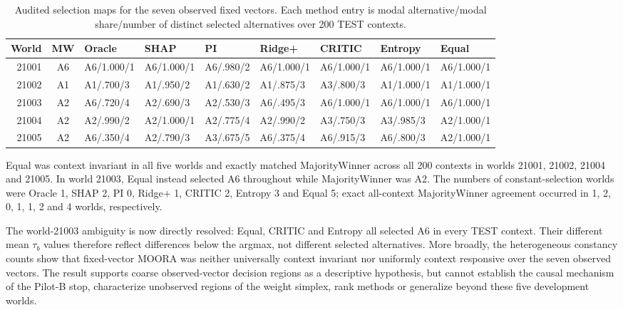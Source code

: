 \documentclass[runningheads]{llncs}
\begin{document}
\begin{table}[t]
\centering
\caption{Audited selection maps for the seven observed fixed vectors. Each method entry is
modal alternative/modal share/number of distinct selected alternatives over 200 TEST contexts.}
\label{supp:tab:fixedselectionmaps}
\scriptsize
\setlength{\tabcolsep}{2.1pt}
\begin{tabular}{@{}rclllllll@{}}
\toprule
World & MW & Oracle & SHAP & PI & Ridge+ & CRITIC & Entropy & Equal\\
\midrule
21001 & A6 & A6/1.000/1 & A6/1.000/1 & A6/.980/2 & A6/1.000/1 & A6/1.000/1 & A6/1.000/1 & A6/1.000/1\\
21002 & A1 & A1/.700/3 & A1/.950/2 & A1/.630/2 & A1/.875/3 & A3/.800/3 & A1/1.000/1 & A1/1.000/1\\
21003 & A2 & A6/.720/4 & A2/.690/3 & A2/.530/3 & A6/.495/3 & A6/1.000/1 & A6/1.000/1 & A6/1.000/1\\
21004 & A2 & A2/.990/2 & A2/1.000/1 & A2/.775/4 & A2/.990/2 & A3/.750/3 & A3/.985/3 & A2/1.000/1\\
21005 & A2 & A6/.350/4 & A2/.790/3 & A3/.675/5 & A6/.375/4 & A6/.915/3 & A6/.800/3 & A2/1.000/1\\
\bottomrule
\end{tabular}
\end{table}

Equal was context invariant in all five worlds and exactly matched MajorityWinner across all
200 contexts in worlds 21001, 21002, 21004 and 21005. In world 21003, Equal instead selected A6
throughout while MajorityWinner was A2. The numbers of constant-selection worlds were
Oracle 1, SHAP 2, PI 0, Ridge+ 1, CRITIC 2, Entropy 3 and Equal 5; exact all-context
MajorityWinner agreement occurred in 1, 2, 0, 1, 1, 2 and 4 worlds, respectively.

The world-21003 ambiguity is now directly resolved: Equal, CRITIC and Entropy all selected A6
in every TEST context. Their different mean $\tau_b$ values therefore reflect differences below
the argmax, not different selected alternatives. More broadly, the heterogeneous constancy
counts show that fixed-vector MOORA was neither universally context invariant nor uniformly
context responsive over the seven observed vectors. The result supports coarse
observed-vector decision regions as a descriptive hypothesis, but cannot establish the causal
mechanism of the Pilot-B stop, characterize unobserved regions of the weight simplex, rank
methods or generalize beyond these five development worlds.
\end{document}
